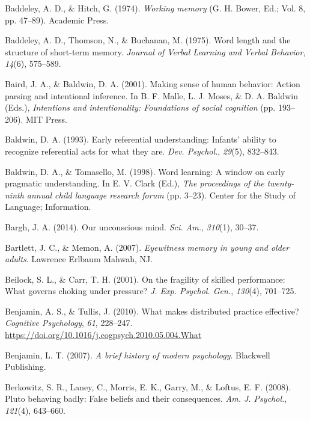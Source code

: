 \documentclass[
]{krantz}
\newlength{\cslhangindent}
\newenvironment{CSLReferences}[2] %
 {\begin{list}{}{%
  \setlength{\itemindent}{0pt}
  \setlength{\leftmargin}{0pt}
  \setlength{\parsep}{0pt}
  \ifodd #1
   \setlength{\leftmargin}{\cslhangindent}
   \setlength{\itemindent}{-1\cslhangindent}
  \fi
  \setlength{\itemsep}{#2\baselineskip}}}
 {\end{list}}
\begin{document}
\begin{CSLReferences}{1}{0}
Baddeley, A. D., \& Hitch, G. (1974). \emph{Working memory} (G. H. Bower, Ed.; Vol. 8, pp. 47--89). Academic Press.

Baddeley, A. D., Thomson, N., \& Buchanan, M. (1975). Word length and the structure of short-term memory. \emph{Journal of Verbal Learning and Verbal Behavior}, \emph{14}(6), 575--589.

Baird, J. A., \& Baldwin, D. A. (2001). Making sense of human behavior: Action parsing and intentional inference. In B. F. Malle, L. J. Moses, \& D. A. Baldwin (Eds.), \emph{Intentions and intentionality: Foundations of social cognition} (pp. 193--206). MIT Press.

Baldwin, D. A. (1993). Early referential understanding: Infants' ability to recognize referential acts for what they are. \emph{Dev. Psychol.}, \emph{29}(5), 832--843.

Baldwin, D. A., \& Tomasello, M. (1998). Word learning: A window on early pragmatic understanding. In E. V. Clark (Ed.), \emph{The proceedings of the twenty-ninth annual child language research forum} (pp. 3--23). Center for the Study of Language; Information.

Bargh, J. A. (2014). Our unconscious mind. \emph{Sci. Am.}, \emph{310}(1), 30--37.

Bartlett, J. C., \& Memon, A. (2007). \emph{Eyewitness memory in young and older adults}. Lawrence Erlbaum Mahwah, NJ.

Beilock, S. L., \& Carr, T. H. (2001). On the fragility of skilled performance: What governs choking under pressure? \emph{J. Exp. Psychol. Gen.}, \emph{130}(4), 701--725.

Benjamin, A. S., \& Tullis, J. (2010). What makes distributed practice effective? \emph{Cognitive Psychology}, \emph{61}, 228--247. \url{https://doi.org/10.1016/j.cogpsych.2010.05.004.What}

Benjamin, L. T. (2007). \emph{A brief history of modern psychology}. Blackwell Publishing.

Berkowitz, S. R., Laney, C., Morris, E. K., Garry, M., \& Loftus, E. F. (2008). Pluto behaving badly: False beliefs and their consequences. \emph{Am. J. Psychol.}, \emph{121}(4), 643--660.


\end{CSLReferences}
\end{document}
